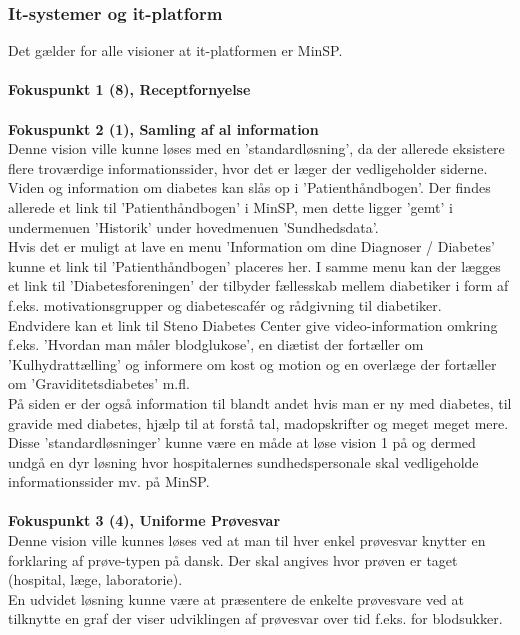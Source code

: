 \subsubsection{It-systemer og it-platform}
Det gælder for alle visioner at it-platformen er MinSP.
\\\\
\textbf{Fokuspunkt 1 (8), Receptfornyelse} \\\\
\textbf{Fokuspunkt 2 (1), Samling af al information} \\
 Denne vision ville kunne løses med en 'standardløsning', da der allerede eksistere flere troværdige informationssider, hvor det er læger der vedligeholder siderne. \\
 Viden og information om diabetes kan slås op i 'Patienthåndbogen'. Der findes allerede et link til 'Patienthåndbogen' i MinSP, men dette ligger 'gemt' i undermenuen 'Historik' under hovedmenuen 'Sundhedsdata'.\\
 Hvis det er muligt at lave en menu 'Information om dine Diagnoser / Diabetes' kunne et link til 'Patienthåndbogen' placeres her. 
 I samme menu kan der lægges et link til 'Diabetesforeningen' der tilbyder fællesskab mellem diabetiker i form af f.eks. motivationsgrupper og diabetescafér og rådgivning til diabetiker.\\
 Endvidere kan et link til Steno Diabetes Center give video-information omkring f.eks. 'Hvordan man måler blodglukose', en diætist der fortæller om 'Kulhydrattælling' og informere om kost og motion og en overlæge der fortæller om 'Graviditetsdiabetes' m.fl. \\
 På siden er der også information til blandt andet hvis man er ny med diabetes, til gravide med diabetes, hjælp til at forstå tal, madopskrifter og meget meget mere. \\ 
 Disse 'standardløsninger' kunne være en måde at løse vision 1 på og dermed undgå en dyr løsning hvor hospitalernes sundhedspersonale skal vedligeholde informationssider mv. på MinSP.
 \\\\
 \textbf{Fokuspunkt 3 (4), Uniforme Prøvesvar} \\
 Denne vision ville kunnes løses ved at man til hver enkel prøvesvar knytter en forklaring af prøve-typen på dansk. Der skal angives hvor prøven er taget (hospital, læge, laboratorie).\\
 En udvidet løsning kunne være at præsentere de enkelte prøvesvare ved at tilknytte en graf der viser udviklingen af prøvesvar over tid f.eks. for blodsukker.\\
